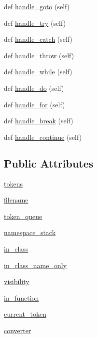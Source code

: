 \begin{DoxyCompactItemize}
\item 
def \hyperlink{classcpp_1_1ast_1_1_ast_builder_a8504d788bb1541ee581918d52d1f4132}{handle\+\_\+goto} (self)
\item 
def \hyperlink{classcpp_1_1ast_1_1_ast_builder_a6c7998f3fdcd046718ff809dbe257645}{handle\+\_\+try} (self)
\item 
def \hyperlink{classcpp_1_1ast_1_1_ast_builder_aa38687383d0f54d26416054cf2141837}{handle\+\_\+catch} (self)
\item 
def \hyperlink{classcpp_1_1ast_1_1_ast_builder_ad4a308ded4a1f87e686b9e11fec31be9}{handle\+\_\+throw} (self)
\item 
def \hyperlink{classcpp_1_1ast_1_1_ast_builder_aac812e812ba2e5fbd80dde93be01a414}{handle\+\_\+while} (self)
\item 
def \hyperlink{classcpp_1_1ast_1_1_ast_builder_a540226b483513b423d4ec2c4f10b18f5}{handle\+\_\+do} (self)
\item 
def \hyperlink{classcpp_1_1ast_1_1_ast_builder_a0025c4d8ca779d69552e0947665eb1c4}{handle\+\_\+for} (self)
\item 
def \hyperlink{classcpp_1_1ast_1_1_ast_builder_a2b663a3e15e70b9d85bf17afb2bcf07a}{handle\+\_\+break} (self)
\item 
def \hyperlink{classcpp_1_1ast_1_1_ast_builder_a511eb003ed301a713a687e5293584077}{handle\+\_\+continue} (self)
\end{DoxyCompactItemize}
\subsection*{Public Attributes}
\begin{DoxyCompactItemize}
\item 
\hyperlink{classcpp_1_1ast_1_1_ast_builder_a1b21f8bef712e91862ccb6b1147cab0d}{tokens}
\item 
\hyperlink{classcpp_1_1ast_1_1_ast_builder_ad8b8f5788de55d6c7151e82af8b21115}{filename}
\item 
\hyperlink{classcpp_1_1ast_1_1_ast_builder_ae167f12797e7c02c1b60c11c83cdb22f}{token\+\_\+queue}
\item 
\hyperlink{classcpp_1_1ast_1_1_ast_builder_ab183aa48e4b6e116379f95eb3d11039c}{namespace\+\_\+stack}
\item 
\hyperlink{classcpp_1_1ast_1_1_ast_builder_a9edc1e10a3f005b463fd9316d83dd15d}{in\+\_\+class}
\item 
\hyperlink{classcpp_1_1ast_1_1_ast_builder_a376583354ab9afa308b7f34105bf3f4a}{in\+\_\+class\+\_\+name\+\_\+only}
\item 
\hyperlink{classcpp_1_1ast_1_1_ast_builder_a2f16b19846c405101235432d2666b614}{visibility}
\item 
\hyperlink{classcpp_1_1ast_1_1_ast_builder_ad5ac0612dfff44241033864832dbdfe3}{in\+\_\+function}
\item 
\hyperlink{classcpp_1_1ast_1_1_ast_builder_a38579523ccc1ae9d202ac722baea45fc}{current\+\_\+token}
\item 
\hyperlink{classcpp_1_1ast_1_1_ast_builder_ae8551cf0405bc6e367636b1f3b37d083}{converter}
\end{DoxyCompactItemize}


